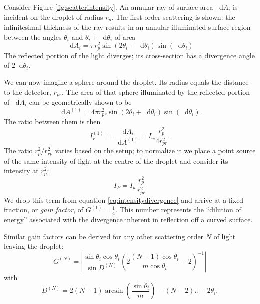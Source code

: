 \documentclass[11.5pt]{book}
\newcommand*\diff{\mathop{}\!\mathrm{d}}
\begin{document}
Consider Figure \ref{fig:scatterintensity}. An annular ray of surface area
$\diff A_i$ is incident on the droplet of radius $r_p$. The first-order scattering is shown: the
infinitesimal thickness of the ray results in an annular illuminated surface
region between the angles $\theta_i$ and $\theta_i + \diff \theta_i$ of area
\begin{equation}
   \diff A_i = \pi r_p^2 \sin(2 \theta_i + \diff \theta_i) \sin(\diff \theta_i)
\end{equation}
The reflected portion of the light diverges; its cross-section has a
divergence angle of $2\diff \theta_i$.

We can now imagine a sphere around the droplet. Its radius equals the distance
to the detector, $r_{pr}$. The area of that sphere illuminated by the reflected
portion of $\diff A_i$ can be geometrically shown to be
\begin{equation}
    \diff A^{(1)} = 4\pi r_{pr}^2 \sin(2\theta_i + \diff \theta_i)\sin(\diff
    \theta_i).
\end{equation}
The ratio between them is then
\begin{equation}
    \label{eq:intensitydivergence}
    I_r^{(1)} = \frac{\diff A_i}{\diff A^{(1)}} = I_w \frac{r_p^2}{4r_{pr}^2}.
\end{equation}
The ratio $r^2_p / r^2_{rp}$ varies based on the setup; to normalize it we
place a point source of the same intensity of light at the centre of the
droplet and consider its intensity at $r^2_p$:
\begin{equation}
    I_P = I_w\frac{r^2_p}{r^2_{pr}}
\end{equation}
We drop this term from equation \eqref{eq:intensitydivergence} and arrive at a
fixed fraction, or \emph{gain factor}, of $G^{(1)} = \frac{1}{4}$. This number
represents the ``dilution of energy'' associated with the divergence inherent in
reflection off a curved surface.

Similar gain factors can be derived for any other scattering order $N$ of light
leaving the droplet:
\begin{equation}
    \label{eq:gainfactor}
    G^{(N)} = \left| \frac{\sin \theta_i \cos \theta_i}{\sin D^{(N)}} \left(2
    \frac{(N-1)\cos \theta_i}{m \cos \theta_t} - 2\right)^{-1} \right|
\end{equation}
with
\begin{equation}
    D^{(N)} = 2(N-1) \arcsin \left(\frac{\sin \theta_i}{m}\right) - (N-2)\pi -
    2\theta_i.
\end{equation}
\end{document}
